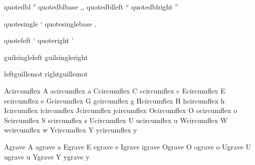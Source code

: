  quotedbl         {"}
 quotedblbase     {,,}
 quotedblleft     {``}
 quotedblright    {''}

 quotesingle      {`}
 quotesinglebase  {,}

 quoteleft        {`}
 quoteright       {'}

 guilsingleleft   {\fakeleftsubguillemot } 
 guilsingleright  {\fakerightsubguillemot}    

 leftguillemot    {\fakeleftguillemot }
 rightguillemot   {\fakerightguillemot}

 Acircumflex      {\buildtextaccent\textcircumflex A}
 acircumflex      {\buildtextaccent\textcircumflex a}
 Ccircumflex      {\buildtextaccent\textcircumflex C}
 ccircumflex      {\buildtextaccent\textcircumflex c}
 Ecircumflex      {\buildtextaccent\textcircumflex E}
 ecircumflex      {\buildtextaccent\textcircumflex e}
 Gcircumflex      {\buildtextaccent\textcircumflex G}
 gcircumflex      {\buildtextaccent\textcircumflex g}
 Hcircumflex      {\buildtextaccent\textcircumflex H}
 hcircumflex      {\buildtextaccent\textcircumflex h}
 Icircumflex      {\buildtextaccent\textcircumflex \dotlessI}
 icircumflex      {\buildtextaccent\textcircumflex \dotlessi}
 Jcircumflex      {\buildtextaccent\textcircumflex \dotlessJ}
 jcircumflex      {\buildtextaccent\textcircumflex \dotlessj}
 Ocircumflex      {\buildtextaccent\textcircumflex O}
 ocircumflex      {\buildtextaccent\textcircumflex o}
 Scircumflex      {\buildtextaccent\textcircumflex S}
 scircumflex      {\buildtextaccent\textcircumflex s}
 Ucircumflex      {\buildtextaccent\textcircumflex U}
 ucircumflex      {\buildtextaccent\textcircumflex u}
 Wcircumflex      {\buildtextaccent\textcircumflex W}
 wcircumflex      {\buildtextaccent\textcircumflex w}
 Ycircumflex      {\buildtextaccent\textcircumflex Y}
 ycircumflex      {\buildtextaccent\textcircumflex y}

 Agrave           {\buildtextaccent\textgrave A}
 agrave           {\buildtextaccent\textgrave a}
 Egrave           {\buildtextaccent\textgrave E}
 egrave           {\buildtextaccent\textgrave e}
 Igrave           {\buildtextaccent\textgrave \dotlessI}
 igrave           {\buildtextaccent\textgrave \dotlessi}
 Ograve           {\buildtextaccent\textgrave O}
 ograve           {\buildtextaccent\textgrave o}
 Ugrave           {\buildtextaccent\textgrave U}
 ugrave           {\buildtextaccent\textgrave u}
 Ygrave           {\buildtextaccent\textgrave Y}
 ygrave           {\buildtextaccent\textgrave y}

